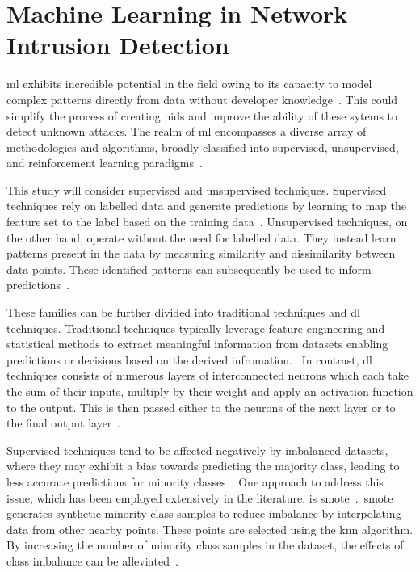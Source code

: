 \section{Machine Learning in Network Intrusion Detection}%
\label{sec:ml_nids}

\gls{ml} exhibits incredible potential in the field owing to its capacity to
model complex patterns directly from data without developer knowledge~\cite{ml}.
This could simplify the process of creating \gls{nids} and improve the ability
of these sytems to detect unknown attacks. The realm of \gls{ml} encompasses a
diverse array of methodologies and algorithms, broadly classified into
supervised, unsupervised, and reinforcement learning paradigms~\cite{ml_taxonomy}.

This study will consider supervised and unsupervised techniques. Supervised
techniques rely on labelled data and generate predictions by learning to map
the feature set to the label based on the training data~\cite{supervised_ml,
    ml_taxonomy}. Unsupervised techniques, on the other hand, operate without the
need for labelled data. They instead learn patterns present in the data by
measuring similarity and dissimilarity between data points. These identified
patterns can subsequently be used to inform predictions~\cite{unsupervised_ml,
    ml_taxonomy}.

These families can be further divided into traditional techniques and \gls{dl}
techniques. Traditional techniques typically leverage feature engineering and
statistical methods to extract meaningful information from datasets enabling
predictions or decisions based on the derived
infromation.~\cite{Najafabadi2015, useful_ml} In contrast, \gls{dl} techniques
consists of numerous layers of interconnected neurons which each take the sum
of their inputs, multiply by their weight and apply an activation function to
the output. This is then passed either to the neurons of the next layer or to
the final output layer~\cite{dl}.


Supervised techniques tend to be affected negatively by imbalanced datasets,
where they may exhibit a bias towards predicting the majority class, leading to
less accurate predictions for minority classes~\cite{imbalance_prob, survey_cicids}.
One approach to address this issue, which has been employed extensively in the
literature, is \gls{smote}~\cite{smote, smote_survey, Karatas, Jiang}.\
\gls{smote} generates synthetic minority class samples to reduce imbalance by
interpolating data from other nearby points. These points are selected using
the \gls{knn} algorithm. By increasing the number of minority class samples in
the dataset, the effects of class imbalance can be alleviated~\cite{smote}.

